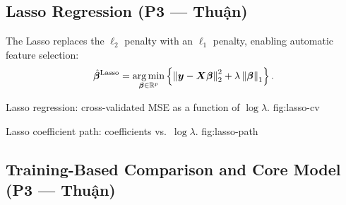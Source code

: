 \subsection{Lasso Regression (P3 — Thuận)}
\label{sec:lasso}

The Lasso replaces the $\ell_2$ penalty with an $\ell_1$ penalty, enabling
automatic feature selection:
\[
    \hat{\bm{\beta}}^{\mathrm{Lasso}}
    = \operatorname*{arg\,min}_{\bm{\beta} \in \mathbb{R}^p}
      \left\{
          \left\lVert \bm{y} - \bm{X} \bm{\beta} \right\rVert_2^2
          + \lambda \left\lVert \bm{\beta} \right\rVert_1
      \right\}.
\]

%
    {Lasso regression: cross-validated MSE as a function of $\log\lambda$.}%
    {fig:lasso-cv}

%
    {Lasso coefficient path: coefficients vs.\ $\log\lambda$.}%
    {fig:lasso-path}

\begin{table}[H]
\centering
\caption{Lasso-selected features and their coefficient estimates.}
\label{tab:lasso-selected}
% 
\end{table}


\subsection{Training-Based Comparison and Core Model (P3 — Thuận)}
\label{sec:comparison}

\begin{table}[H]
\centering
\caption{Training CV performance comparison across OLS, Ridge, and Lasso.}
\label{tab:model-comparison}
% 
\end{table}

